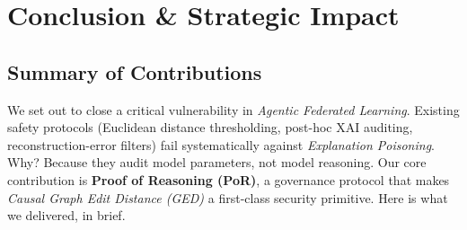 \documentclass[journal]{IEEEtran}
\begin{document}
\section{Conclusion \& Strategic Impact}

\subsection{Summary of Contributions}

We set out to close a critical vulnerability in \emph{Agentic Federated Learning}. Existing safety protocols (Euclidean distance thresholding, post-hoc XAI auditing, reconstruction-error filters) fail systematically against \emph{Explanation Poisoning}. Why? Because they audit model parameters, not model reasoning. Our core contribution is \textbf{Proof of Reasoning (PoR)}, a governance protocol that makes \emph{Causal Graph Edit Distance (GED)} a first-class security primitive. Here is what we delivered, in brief.
\end{document}
